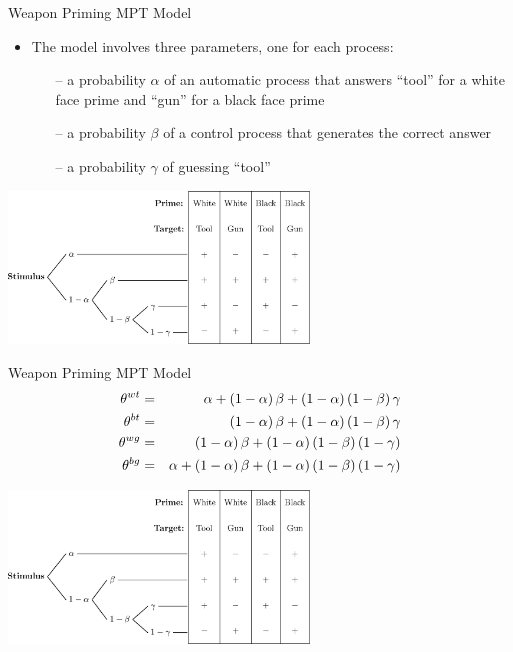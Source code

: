 \documentclass[aspectratio=169]{beamer}
\begin{document}
\begin{frame}[fragile]{Weapon Priming MPT Model}
\begin{itemize}
\item The model involves three parameters, one for each process:
\begin{itemize}
\item[--] a probability $\alpha$ of an automatic process that answers ``tool'' for a white face prime and ``gun'' for a black face prime
\item[--] a probability $\beta$ of a control process that generates the correct answer
\item[--] a probability $\gamma$ of guessing ``tool''
\end{itemize}
\end{itemize}
\begin{center}
\includegraphics[width = 0.6\textwidth]{figures/weaponPriming.eps}
\end{center}
\end{frame}

\begin{frame}[fragile]{Weapon Priming MPT Model}
\vspace{-2em}
\begin{eqnarray}\small
\theta^{wt} &=& \alpha + \left(1-\alpha\right)\beta + \left(1-\alpha\right)\left(1-\beta\right)\gamma \nonumber\\
\theta^{bt} &=& \left(1-\alpha\right)\beta + \left(1-\alpha\right)\left(1-\beta\right)\gamma \nonumber\\
\theta^{wg} &=& \left(1-\alpha\right)\beta + \left(1-\alpha\right)\left(1-\beta\right)\left(1-\gamma\right) \nonumber\\
\theta^{bg} &=& \alpha + \left(1-\alpha\right)\beta + \left(1-\alpha\right)\left(1-\beta\right)\left(1-\gamma\right) \nonumber
\end{eqnarray}
\begin{center}
\includegraphics[width = 0.6\textwidth]{figures/weaponPriming.eps}
\end{center}
\end{frame}
\end{document}
